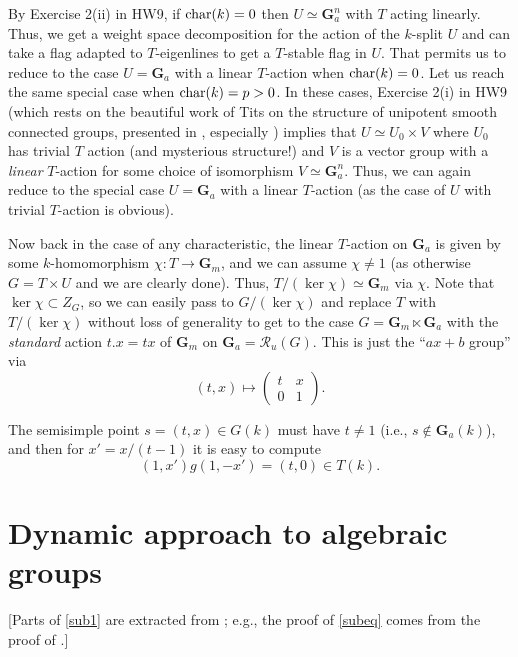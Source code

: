 \documentclass[10pt]{article}
\renewcommand{\(}{\left(}
\renewcommand{\)}{\right)}
\numberwithin{thm}{subsection}
\begin{document}
By Exercise 2(ii) in HW9, if ${\rm{char}}(k) = 0$ then $U \simeq \mathbf{G}_a^n$ with $T$ acting linearly.  Thus, 
we get a weight space decomposition for the action of the $k$-split $U$ and can take a flag adapted to $T$-eigenlines to get
a $T$-stable flag in $U$.  That permits us to reduce to the case $U = \mathbf{G}_a$ with a linear $T$-action when
${\rm{char}}(k) = 0$.  Let us reach the same special case when ${\rm{char}}(k) = p > 0$. In these cases,
Exercise 2(i) in HW9 (which rests on the beautiful work of Tits on the structure of unipotent smooth connected groups,  presented
in \cite[App.\,B]{pred}, especially \cite[Thm.\,B.4.3]{pred}) implies that $U \simeq U_0 \times V$
where $U_0$ has trivial $T$ action (and mysterious structure!) and $V$ is a vector group with a {\em linear} $T$-action
for some choice of isomorphism $V \simeq \mathbf{G}_a^n$.  Thus, we can again reduce to the special case
$U = \mathbf{G}_a$ with a linear $T$-action (as the case of $U$ with trivial $T$-action is obvious). 

Now back in the case of any characteristic, the linear $T$-action on $\mathbf{G}_a$ is given by
some $k$-homomorphism $\chi:T \rightarrow \mathbf{G}_m$, and we can assume $\chi \ne 1$ (as otherwise
$G = T \times U$ and we are clearly done).  Thus, $T/(\ker \chi) \simeq \mathbf{G}_m$ via $\chi$.
Note that $\ker \chi \subset Z_G$, so we can easily pass
to $G/(\ker \chi)$ and replace $T$ with $T/(\ker \chi)$ without loss of generality to get
to the case $G = \mathbf{G}_m \ltimes \mathbf{G}_a$ with the {\em standard} action
$t.x = tx$ of $\mathbf{G}_m$ on $\mathbf{G}_a = \mathscr{R}_u(G)$.
This is just the ``$ax+b$ group'' via
$$(t,x) \mapsto \begin{pmatrix} t & x \\ 0 & 1 \end{pmatrix}.$$

The semisimple point $s = (t,x) \in G(k)$ must have $t \ne 1$ (i.e., $s \not\in \mathbf{G}_a(k)$), and then for
$x' = x/(t-1)$ it is easy to compute
$$(1,x')g(1,-x') = (t,0) \in T(k).$$

\section{Dynamic approach to algebraic groups}\label{dynamic}

[Parts of \ref{sub1} are extracted from \cite[\S2.1]{pred}; e.g., the proof of \ref{subeq} comes from the proof of \cite[2.1.8(3)]{pred}.]

\medskip\noindent
\end{document}
